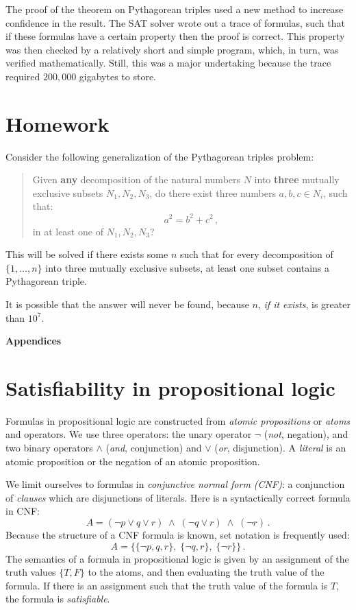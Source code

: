 \documentclass[11pt,a4paper]{article}
\newcommand*{\ngg}{\mathop{\neg}}
\begin{document}
The proof of the theorem on Pythagorean triples used a new method to increase confidence in the result. The SAT solver wrote out a trace of formulas, such that if these formulas have a certain property then the proof is correct. This property was then checked by a relatively short and simple program, which, in turn, was verified mathematically. Still, this was a major undertaking because the trace required $200,000$ gigabytes to store.

\section{Homework}

Consider the following generalization of the Pythagorean triples problem:
\begin{quote}
Given \textbf{any} decomposition of the natural numbers $N$ into \textbf{three} mutually exclusive subsets $N_1,N_2,N_3$, do there exist three numbers $a,b,c\in N_i$, such that:
\[
a^2=b^2+c^2\,,
\]
in at least one of $N_1,N_2,N_3$?
\end{quote}
This will be solved if there exists some $n$ such that for every decomposition of $\{1,\ldots,n\}$ into three mutually exclusive subsets, at least one subset contains a Pythagorean triple.

It is possible that the answer will never be found, because $n$, \emph{if it exists}, is greater than $10^7$.

\newpage

\textbf{\Large Appendices}

\appendix

\section{Satisfiability in propositional logic}

Formulas in propositional logic are constructed from \emph{atomic propositions} or \emph{atoms} and operators. We use three operators: the unary operator $\ngg$ (\emph{not}, negation), and two binary operators $\wedge$ (\emph{and}, conjunction) and $\vee$ (\emph{or}, disjunction). A \emph{literal} is an atomic proposition or the negation of an atomic proposition.

We limit ourselves to formulas in \emph{conjunctive normal form (CNF)}: a conjunction of \emph{clauses} which are disjunctions of literals. Here is a syntactically correct formula in CNF:
\[
A=(\ngg p \vee q \vee r) \;\wedge\; (\ngg q \vee r) \;\wedge\; (\ngg r)\,.
\]
Because the structure of a CNF formula is known, set notation is frequently used:
\[
A=\{\{\ngg p, q, r\}, \; \{\ngg q, r\}, \; \{\ngg r\}\}\,.
\]
The semantics of a formula in propositional logic is given by an assignment of the truth values $\{T,F\}$ to the atoms, and then evaluating the truth value of the formula. If there is an assignment such that the truth value of the formula is $T$, the formula is \emph{satisfiable}.
\end{document}
